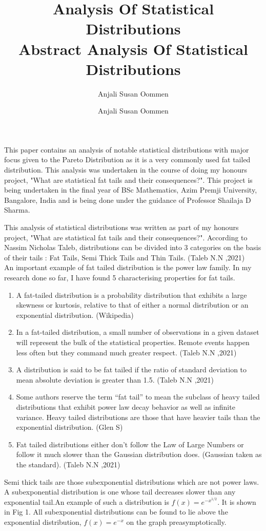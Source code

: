 \documentclass[14pt, a4paper]{article}
\title{Analysis Of Statistical Distributions \\ Abstract }
\author{Anjali Susan Oommen}
\date{}
\theoremstyle{definition}
\begin{document}
\maketitle
 

This paper contains an analysis of notable statistical distributions with major focus given to the Pareto Distribution as it is a very commonly used fat tailed distribution. This analysis was undertaken in the course of doing my honours project, "What are statistical fat tails and their consequences?". This project is being undertaken in the final year of BSc Mathematics, Azim Premji University, Bangalore, India and is being done under the guidance of Professor Shailaja D Sharma. 

\newpage
\title{Analysis Of Statistical Distributions}
\author{Anjali Susan Oommen}
\date{}
\maketitle

This analysis of statistical distributions was written as part of my honours project, "What are statistical fat tails and their consequences?". According to Nassim Nicholas Taleb, distributions can be divided into $3$ categories on the basis of their tails : Fat Tails, Semi Thick Tails and Thin Tails. (Taleb N.N ,2021)
\\ An important example of fat tailed distribution is the power law family. In my research done so far, I have found 5 characterising properties for fat tails.
\begin{enumerate}
\item A fat-tailed distribution is a probability distribution that exhibits a large skewness or kurtosis, relative to that of either a normal distribution or an exponential distribution. (Wikipedia)
\item In a fat-tailed distribution, a small number of observations in a given dataset will represent the bulk of the statistical properties. Remote events happen less often but they command much greater respect. (Taleb N.N ,2021)
\item A distribution is said to be fat tailed if the ratio of standard deviation to mean absolute deviation is greater than 1.5. (Taleb N.N ,2021)
\item Some authors reserve the term “fat tail” to mean the subclass of heavy tailed distributions that exhibit power law decay behavior as well as infinite variance. Heavy tailed distributions are those that have heavier tails than the exponential distribution. (Glen S)
\item Fat tailed distributions either don’t follow the Law of Large Numbers or follow it much slower than the Gaussian distribution does. (Gaussian taken as the standard). (Taleb N.N ,2021)
\end{enumerate}
Semi thick tails are those subexponential distributions which are not power laws. A subexponential distribution is one whose tail decreases slower than any exponential tail.An example of such a distribution is $f(x) = e^{-x^{1/2}}$. It is shown in Fig 1. All subexponential distributions can be found to lie above the exponential distribution, $f(x) = e^{-x}$ on the graph preasymptotically.
\end{document}
